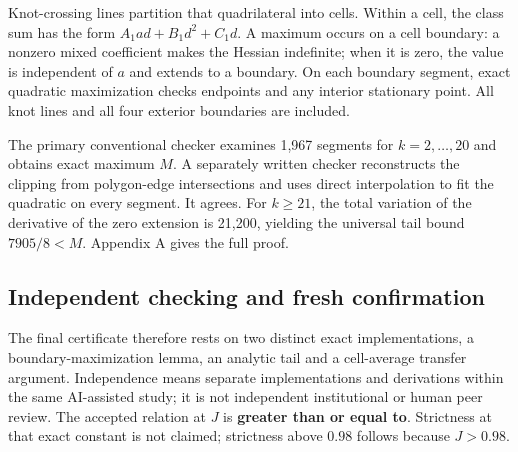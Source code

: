 \documentclass[11pt,a4paper]{article}
\begin{document}
Knot-crossing lines partition that quadrilateral into cells. Within a
cell, the class sum has the form \(A_1ad+B_1d^2+C_1d\). A maximum occurs
on a cell boundary: a nonzero mixed coefficient makes the Hessian
indefinite; when it is zero, the value is independent of \(a\) and
extends to a boundary. On each boundary segment, exact quadratic
maximization checks endpoints and any interior stationary point. All
knot lines and all four exterior boundaries are included.

The primary conventional checker examines 1,967 segments for
\(k=2,\ldots,20\) and obtains exact maximum \(M\). A separately written
checker reconstructs the clipping from polygon-edge intersections and
uses direct interpolation to fit the quadratic on every segment. It
agrees. For \(k\ge21\), the total variation of the derivative of the
zero extension is 21,200, yielding the universal tail bound
\(7905/8<M\). Appendix A gives the full proof.


\hypertarget{independent-checking-and-fresh-confirmation}{%
\subsection{Independent checking and fresh
confirmation}\label{independent-checking-and-fresh-confirmation}}

The final certificate therefore rests on two distinct exact
implementations, a boundary-maximization lemma, an analytic tail and a
cell-average transfer argument. Independence means separate
implementations and derivations within the same AI-assisted study; it is
not independent institutional or human peer review. The accepted
relation at \(J\) is \textbf{greater than or equal to}. Strictness at
that exact constant is not claimed; strictness above \(0.98\) follows
because \(J>0.98\).
\end{document}
